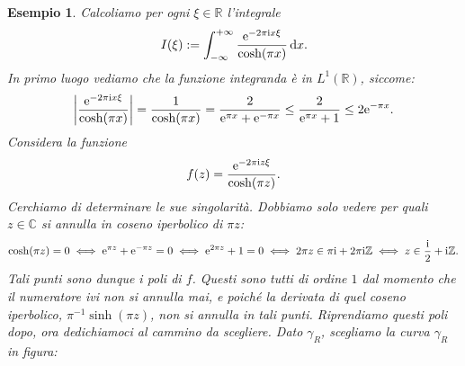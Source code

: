 \documentclass[11pt]{book}
\theoremstyle{Definizione}
\theoremstyle{TeoremaProposizioneLemmaCorollarioCongettura}
\theoremstyle{OsservazioneNotaEsempio}
\newtheorem{myes}{Esempio}[section]
\newcommand{\R}{\mathbb{R}}
\newcommand{\Z}{\mathbb{Z}}
\newcommand{\C}{\mathbb{C}}
\renewcommand{\i}{\textup{i}}
\newcommand{\e}{\textup{e}}
\renewcommand{\d}{\mathrm{d}}
\newcommand{\dx}{\,\d x}
\newcommand{\frecciaIn}{
\tikz \draw[-latex] (-1pt,0) -- (1pt,0);
}
\newcommand{\frecciaOut}{
\tikz \draw[latex-] (-1pt,0) -- (1pt,0);
}
\begin{document}
\begin{myes}\label{es:Esempio2TeoremaDeiResidui}
Calcoliamo per ogni $\xi\in \R$ l'integrale
$$
I(\xi) := \int_{-\infty}^{+\infty} \frac{\e^{-2\pi\i x \xi}}{\cosh(\pi x)}\dx.
$$
In primo luogo vediamo che la funzione integranda è in $L^1(\R)$, siccome:
$$
\left|\frac{\e^{-2\pi\i x \xi}}{\cosh(\pi x)}\right| = \frac{1}{\cosh(\pi x)} = \frac{2}{\e^{\pi x}+\e^{-\pi x}} \leq \frac{2}{\e^{\pi x} + 1} \leq 2\e^{-\pi x}.
$$
Considera la funzione
$$
f(z) = \frac{\e^{-2\pi\i z \xi}}{\cosh(\pi z)}.
$$
Cerchiamo di determinare le sue singolarità. Dobbiamo solo vedere per quali $z\in \C$ si annulla in coseno iperbolico di $\pi z$:
$$
\cosh(\pi z) = 0 \iff \e^{\pi z} + \e^{-\pi z} = 0 \iff \e^{2\pi z} + 1 = 0 \iff 2\pi z \in \pi\i + 2\pi\i\Z \iff z\in \frac{\i}{2}+\i\Z.
$$
Tali punti sono dunque i poli di $f$. Questi sono tutti di ordine $1$ dal momento che il numeratore ivi non si annulla mai, e poiché la derivata di quel coseno iperbolico, $\pi^{-1}\sinh(\pi z)$, non si annulla in tali punti. Riprendiamo questi poli dopo, ora dedichiamoci al cammino da scegliere. Dato $\gamma_R$, scegliamo la curva $\gamma_R$ in figura:
\begin{center}

\end{center}
\end{myes}
\end{document}
